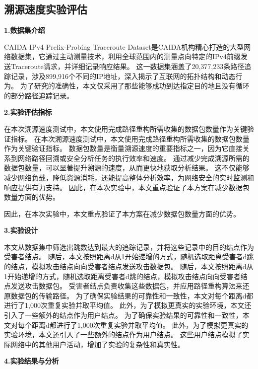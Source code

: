 \begin{enumerate}[a.]
\begin{enumerate}[a.]
\begin{enumerate}[a.]
\begin{enumerate}[a.]
\begin{enumerate}[a.]
\begin{enumerate}[a.]
\begin{enumerate}[a.]
\subsection{溯源速度实验评估}
\textbf{1.数据集介绍}\par
CAIDA IPv4 Prefix-Probing Traceroute Dataset是CAIDA机构精心打造的大型网络数据集，它通过主动测量技术，利用全球范围内的测量点向特定的IPv4前缀发送Traceroute请求，并详细记录响应结果。
这一数据集涵盖了20,377,233条路径追踪记录，涉及899,916个不同的IP地址，深入揭示了互联网的拓扑结构和动态行为。
为了研究的准确性，本文仅采用了那些能够成功到达指定目的地且没有循环的部分路径追踪记录。
\par
\textbf{2.实验评估指标}\par
在本次溯源速度测试中，本文使用完成路径重构所需收集的数据包数量作为关键验证指标。
在本次溯源速度测试中，本文使用完成路径重构所需收集的数据包数量作为关键验证指标。
数据包数量是衡量溯源速度的重要指标之一，因为它直接关系到网络路径回溯或安全分析任务的执行效率和速度。
通过减少完成溯源所需的数据包数量，可以显著提升溯源的速度，从而更快地获取分析结果。
这不仅能够减少网络负载，降低资源消耗，还能提高整体分析效率，为网络安全的实时监测和响应提供有力支持。
因此，在本次实验中，本文重点验证了本方案在减少数据包数量方面的优势。\par
因此，在本次实验中，本文重点验证了本方案在减少数据包数量方面的优势。\par

\textbf{3.实验设计}\par
本文从数据集中筛选出跳数达到最大的追踪记录，并将这些记录中的目的结点作为受害者结点。
随后，本文按照距离d从1开始递增的方式，随机选取距离受害者d跳的结点，模拟攻击结点向向受害者结点发送攻击数据包。
随后，本文按照距离d从1开始递增的方式，随机选取距离受害者d跳的结点，模拟攻击结点向向受害者结点发送攻击数据包。
受害者结点负责收集这些数据包，并应用路径重构算法来还原数据包的传输路径。
为了确保实验结果的可靠性和一致性，本文对每个距离d都进行了1,000次重复实验并取平均值。
此外，为了模拟更真实的实验环境，本文还引入了一些额外的结点作为用户结点。
为了确保实验结果的可靠性和一致性，本文对每个距离d都进行了1,000次重复实验并取平均值。
此外，为了模拟更真实的实验环境，本文还引入了一些额外的结点作为用户结点。
这些用户结点模拟了实际网络中的其他用户活动，增加了实验的复杂性和真实性。\par

\textbf{4.实验结果与分析}\par


\end{enumerate}
\end{enumerate}
\end{enumerate}
\end{enumerate}
\end{enumerate}
\end{enumerate}
\end{enumerate}
